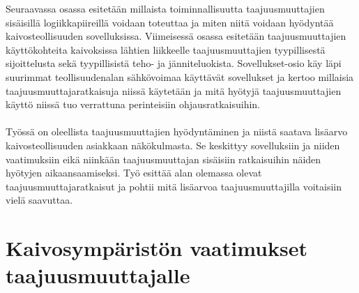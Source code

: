\documentclass[finnish,12pt,a4paper,pdftex,elec,utf8]{aaltothesis}
\begin{document}
Seuraavassa osassa esitetään millaista toiminnallisuutta taajuusmuuttajien sisäisillä logiikkapiireillä voidaan toteuttaa ja miten niitä voidaan hyödyntää kaivosteollisuuden sovelluksissa. Viimeisessä osassa esitetään taajuusmuuttajien käyttökohteita kaivoksissa lähtien liikkeelle taajuusmuuttajien tyypillisestä sijoittelusta sekä tyypillisistä teho- ja jänniteluokista. Sovellukset-osio käy läpi suurimmat teollisuudenalan sähkövoimaa käyttävät sovellukset ja kertoo millaisia taajuusmuuttajaratkaisuja niissä käytetään ja mitä hyötyjä taajuusmuuttajien käyttö niissä tuo verrattuna perinteisiin ohjausratkaisuihin.
\\\\
Työssä on oleellista taajuusmuuttajien hyödyntäminen ja niistä saatava lisäarvo kaivosteollisuuden asiakkaan näkökulmasta. Se keskittyy sovelluksiin ja niiden vaatimuksiin eikä niinkään taajuusmuuttajan sisäisiin ratkaisuihin näiden hyötyjen aikaansaamiseksi. Työ esittää alan olemassa olevat taajuusmuuttajaratkaisut ja pohtii mitä lisäarvoa taajuusmuuttajilla voitaisiin vielä saavuttaa.

\clearpage
\section{Kaivosympäristön vaatimukset taajuusmuuttajalle}
\end{document}
